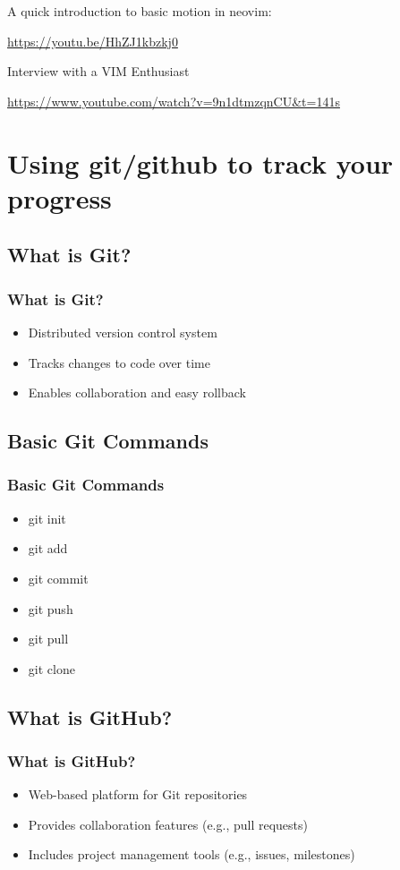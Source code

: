 \documentclass[9pt,table,xcolor=dvipsnames]{beamer}%
\theoremstyle{definition}
\theoremstyle{plain}
\begin{document}
\begin{frame}[fragile] %

  A quick introduction to basic motion in neovim: \\ \bigskip

  \url{https://youtu.be/HhZJ1kbzkj0}

  \vfill

  Interview with a VIM Enthusiast \\ \bigskip

  \url{https://www.youtube.com/watch?v=9n1dtmzqnCU&t=141s}
\end{frame}
\section{Using git/github to track your progress}
\subsection{What is Git?}
\begin{frame}
  \frametitle{What is Git?}
  \begin{itemize}
    \item Distributed version control system
    \item Tracks changes to code over time
    \item Enables collaboration and easy rollback
  \end{itemize}
\end{frame}
\subsection{Basic Git Commands}
\begin{frame}
  \frametitle{Basic Git Commands}
  \begin{itemize}
    \item git init
    \item git add
    \item git commit
    \item git push
    \item git pull
    \item git clone
  \end{itemize}
\end{frame}
\subsection{What is GitHub?}
\begin{frame}
  \frametitle{What is GitHub?}
  \begin{itemize}
    \item Web-based platform for Git repositories
    \item Provides collaboration features (e.g., pull requests)
    \item Includes project management tools (e.g., issues, milestones)
  \end{itemize}
\end{frame}
\end{document}
